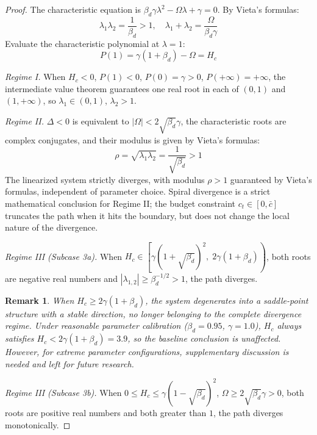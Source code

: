 \documentclass[12pt]{article}
\newtheorem{remark}{Remark}
\begin{document}
\begin{proof}
The characteristic equation is $\beta_d\gamma\lambda^2 - \Omega\lambda + \gamma = 0$. By Vieta's formulas:
\begin{equation}\tag{V}\label{eq:vieta}
\lambda_1\lambda_2 = \frac{1}{\beta_d} > 1, \quad
\lambda_1 + \lambda_2 = \frac{\Omega}{\beta_d\gamma}
\end{equation}
Evaluate the characteristic polynomial at $\lambda = 1$:
\begin{equation}\tag{P1}\label{eq:P1}
P(1) = \gamma(1+\beta_d) - \Omega = H_c
\end{equation}

\textit{Regime I.} When $H_c < 0$, $P(1) < 0$, $P(0) = \gamma > 0$, $P(+\infty) = +\infty$,
the intermediate value theorem guarantees one real root in each of $(0,1)$ and $(1,+\infty)$, so $\lambda_1 \in (0,1)$, $\lambda_2 > 1$.

\textit{Regime II.} $\Delta < 0$ is equivalent to $|\Omega| < 2\sqrt{\beta_d}\gamma$, the characteristic roots are complex conjugates,
and their modulus is given by Vieta's formulas:
\begin{equation}\label{eq:rho}
\rho = \sqrt{\lambda_1\lambda_2} = \frac{1}{\sqrt{\beta_d}} > 1
\end{equation}
The linearized system strictly diverges, with modulus $\rho > 1$ guaranteed by Vieta's formulas, independent of parameter choice. Spiral divergence is
a strict mathematical conclusion for Regime II; the budget constraint $c_t \in [0, \bar{c}]$ truncates the path when it hits the boundary, but does not
change the local nature of the divergence.

\textit{Regime III (Subcase 3a).}
When $H_c \in \left[\gamma(1+\sqrt{\beta_d})^2,\; 2\gamma(1+\beta_d)\right)$,
both roots are negative real numbers and $|\lambda_{1,2}| \geq \beta_d^{-1/2} > 1$,
the path diverges.

\begin{remark}
When $H_c \geq 2\gamma(1+\beta_d)$,
the system degenerates into a saddle-point structure with a stable direction,
no longer belonging to the complete divergence regime.
Under reasonable parameter calibration ($\beta_d=0.95$, $\gamma=1.0$),
$H_c$ always satisfies $H_c < 2\gamma(1+\beta_d) = 3.9$,
so the baseline conclusion is unaffected. However, for extreme parameter configurations,
supplementary discussion is needed and left for future research.
\end{remark}
\textit{Regime III (Subcase 3b).} When $0 \leq H_c \leq \gamma(1-\sqrt{\beta_d})^2$,
$\Omega \geq 2\sqrt{\beta_d}\gamma > 0$, both roots are positive real numbers and both greater than $1$, the path diverges monotonically.
\end{proof}
\end{document}
